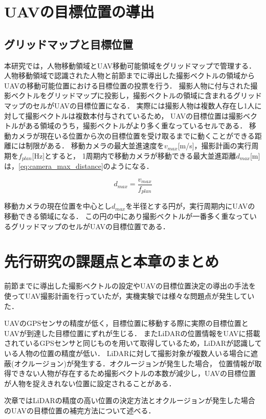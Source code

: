 \documentclass[autodetect-engine,dvipdfmx-if-dvi,ja=standard,a4j,jbase=11pt,magstyle=nomag*]{bxjsreport}
\begin{document}
\section{UAVの目標位置の導出}
\subsection{グリッドマップと目標位置}
本研究では，人物移動領域とUAV移動可能領域をグリッドマップで管理する．
人物移動領域で認識された人物と前節までに導出した撮影ベクトルの領域からUAVの移動可能位置における目標位置の投票を行う．
撮影人物に付与された撮影ベクトルをグリッドマップに投影し，撮影ベクトルの領域に含まれるグリッドマップのセルがUAVの目標位置になる．
実際には撮影人物は複数人存在し1人に対して撮影ベクトルは複数本付与されているため，
UAVの目標位置は撮影ベクトルがある領域のうち，撮影ベクトルがより多く重なっているセルである．
移動カメラが現在いる位置から次の目標位置を受け取るまでに動くことができる距離には制限がある．
移動カメラの最大並進速度を$v_{max}$[m/s]，撮影計画の実行周期を$f_{plan}$[Hz]とすると，
1周期内で移動カメラが移動できる最大並進距離$d_{max}$[m]は，\cref{eq:camera_max_distance}のようになる．

\begin{equation}
d_{max} = \frac{v_{max}}{f_{plan}}
\label{eq:camera_max_distance}
\end{equation}

移動カメラの現在位置を中心とし$d_{max}$を半径とする円が，実行周期内にUAVの移動できる領域になる．
この円の中にあり撮影ベクトルが一番多く重なっているグリッドマップのセルがUAVの目標位置である．

\section{先行研究の課題点と本章のまとめ}
前節までに導出した撮影ベクトルの設定やUAVの目標位置決定の導出の手法を使ってUAV撮影計画を行っていたが，実機実験では様々な問題点が発生していた．

UAVのGPSセンサの精度が低く，目標位置に移動する際に実際の目標位置とUAVが到達した目標位置にずれが生じる．
またLiDARの位置情報をUAVに搭載されているGPSセンサと同じものを用いて取得しているため，LiDARが認識している人物の位置の精度が低い．
LiDARに対して撮影対象が複数人いる場合に遮蔽(オクルージョン)が発生する．オクルージョンが発生した場合，
位置情報が取得できない人物が存在するため撮影ベクトルの本数が減少し，UAVの目標位置が人物を捉えきれない位置に設定されることがある．

次章ではLiDARの精度の高い位置の決定方法とオクルージョンが発生した場合のUAVの目標位置の補完方法について述べる．
\end{document}
